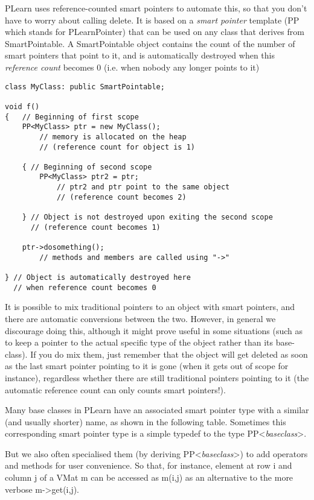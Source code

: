 \documentclass[11pt]{book}
\begin{document}
 PLearn uses reference-counted smart pointers to automate this, so
that you don't have to worry about calling delete. It is based on a
\emph{smart pointer} template (PP which stands for PLearnPointer)
that can be used on any class that derives from SmartPointable. A
SmartPointable object contains the count of the number of smart
pointers that point to it, and is automatically destroyed when this
\emph{reference count} becomes 0 (i.e. when nobody any longer points
to it)

\begin{verbatim}
class MyClass: public SmartPointable;

void f()
{   // Beginning of first scope
    PP<MyClass> ptr = new MyClass();
        // memory is allocated on the heap
        // (reference count for object is 1)

    { // Beginning of second scope
        PP<MyClass> ptr2 = ptr;
            // ptr2 and ptr point to the same object
            // (reference count becomes 2)

    } // Object is not destroyed upon exiting the second scope 
      // (reference count becomes 1)

    ptr->dosomething();
        // methods and members are called using "->"

} // Object is automatically destroyed here 
  // when reference count becomes 0
\end{verbatim}

It is possible to mix traditional pointers to an object with smart
pointers, and there are automatic conversions between the two. However,
in general we discourage doing this, although it might prove useful in
some situations (such as to keep a pointer to the actual specific type
of the object rather than its base-class). If you do mix them, just
remember that the object will get deleted as soon as the last smart
pointer pointing to it is gone (when it gets out of scope for instance),
regardless whether there are still traditional pointers pointing to it
(the automatic reference count can only counts smart pointers!).


 Many base classes in PLearn have an associated smart pointer type
with a similar (and usually shorter) name, as shown in the following
table. Sometimes this corresponding smart pointer type is a simple
typedef to the type PP<\emph{baseclass}>.

But we also often specialised them (by deriving PP<\emph{baseclass}>)
to add operators and methods for user convenience. So that, for
instance, element at row i and column j of a VMat m can be accessed
as m(i,j) as an alternative to the more verbose m->get(i,j).
\end{document}
